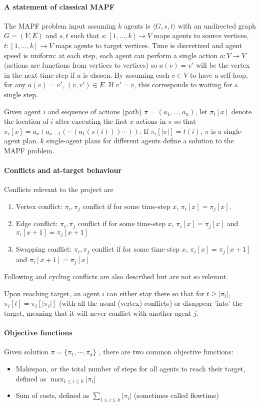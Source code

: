 \documentclass[a4paper,10pt,english]{article}
\begin{document}
	\paragraph{A statement of classical MAPF}
	The MAPF problem input assuming $k$ agents is $\langle G, s, t\rangle$ with an undirected graph $G = (V,E)$ and $s,t$ such that $s: [1,\ldots,k] \to V$ maps agents to source vertices, $t: [1,\ldots,k] \to V$ maps agents to target vertices. Time is discretized and agent speed is uniform: at each step, each agent can perform a single action $a : V \to V$ (actions are functions from vertices to vertices) so $a(v) = v'$ will be the vertex in the next time-step if $a$ is chosen. By assuming each $v\in V$ to have a self-loop, for any $a(v) = v'$, $(v,v') \in E$. If $v' = v$, this corresponds to waiting for a single step.
	
	Given agent $i$ and sequence of actions (path) $\pi = (a_1,\ldots,a_n)$, let $\pi_i[x]$ denote the location of $i$ after executing the first $x$ actions in $\pi$ so that $\pi_i[x] = a_x(a_{x-1}(\cdots(a_1(s(i)))\cdots))$. If $\pi_i[|\pi|] = t(i)$, $\pi$ is a single-agent plan. $k$ single-agent plans for different agents define a solution to the MAPF problem.
	
	\paragraph{Conflicts and at-target behaviour}
	Conflicts relevant to the project are
	\begin{enumerate}
		\item Vertex conflict: $\pi_i,\pi_j$ conflict if for some time-step $x$, $\pi_i[x] = \pi_j[x]$.
		\item Edge conflict: $\pi_i,\pi_j$ conflict if for some time-step $x$, $\pi_i[x] = \pi_j[x]$ and $\pi_i[x+1] = \pi_j[x+1]$
		\item Swapping conflict: $\pi_i,\pi_j$ conflict if for some time-step $x$, $\pi_i[x] = \pi_j[x+1]$ and $\pi_i[x+1] = \pi_j[x]$
	\end{enumerate}
	Following and cycling conflicts are also described but are not so relevant.
	
	Upon reaching target, an agent $i$ can either stay there so that for $t\geq |\pi_i|$, $\pi_i[t] = \pi_i[|\pi_i|]$ (with all the usual (vertex) conflicts) or disappear 'into' the target, meaning that it will never conflict with another agent $j$.
	\paragraph{Objective functions}
	Given solution $\pi = \{\pi_1,\cdots,\pi_k\}$ , there are two common objective functions:
	\begin{itemize}
	\item Makespan, or the total number of steps for all agents to reach their target, defined as $\max_{1\leq i \leq k} |\pi_i]$
	\item Sum of costs, defined as $\sum_{1\leq i \leq k} |\pi_i|$ (sometimes called flowtime)
	\end{itemize}
\end{document}
